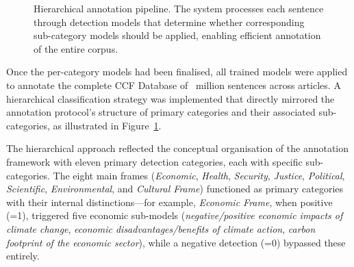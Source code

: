 \documentclass[12pt]{article}
\renewcommand\_{\texttt{\detokenize{_}\allowbreak}}
\begin{document}
\begin{figure}[b!]
{
}
\caption{Hierarchical annotation pipeline. The system processes each sentence through detection models that determine whether corresponding sub-category models should be applied, enabling efficient annotation of the entire corpus.}
\label{fig:hierarchical_annotation}
\end{figure}

Once the per-category models had been finalised, all trained models were applied to annotate the complete CCF Database of \CCFsentApprox{}~million sentences across \CCFarticles{} articles. A hierarchical classification strategy was implemented that directly mirrored the annotation protocol's structure of primary categories and their associated sub-categories, as illustrated in Figure~\ref{fig:hierarchical_annotation}.

The hierarchical approach reflected the conceptual organisation of the annotation framework with eleven primary detection categories, each with specific sub-categories. The eight main frames (\emph{Economic}, \emph{Health}, \emph{Security}, \emph{Justice}, \emph{Political}, \emph{Scientific}, \emph{Environmental}, and \emph{Cultural Frame}) functioned as primary categories with their internal distinctions---for example, \emph{Economic Frame}, when positive (=1), triggered five economic sub-models (\emph{negative/positive economic impacts of climate change}, \emph{economic disadvantages/benefits of climate action}, \emph{carbon footprint of the economic sector}), while a negative detection (=0) bypassed these entirely.
\end{document}
